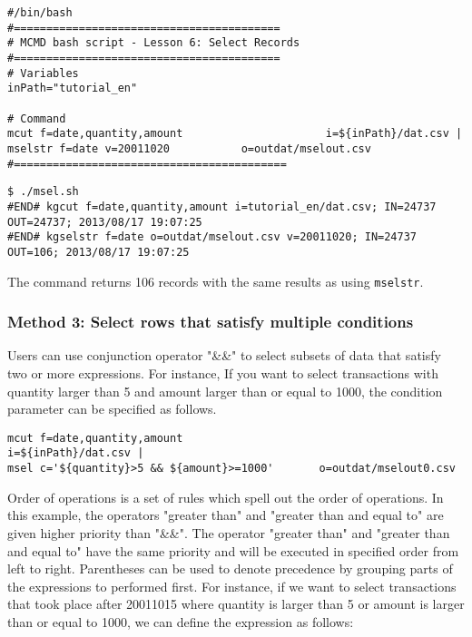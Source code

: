 \begin{verbatim}
#/bin/bash
#=========================================
# MCMD bash script - Lesson 6: Select Records 
#=========================================
# Variables
inPath="tutorial_en"

# Command 
mcut f=date,quantity,amount                      i=${inPath}/dat.csv |
mselstr f=date v=20011020  			o=outdat/mselout.csv
#==========================================
\end{verbatim}



\begin{verbatim}
$ ./msel.sh
#END# kgcut f=date,quantity,amount i=tutorial_en/dat.csv; IN=24737 OUT=24737; 2013/08/17 19:07:25
#END# kgselstr f=date o=outdat/mselout.csv v=20011020; IN=24737 OUT=106; 2013/08/17 19:07:25
\end{verbatim}

\noindent
The command returns 106 records with the same results as using \verb|mselstr|. 

\subsubsection{Method 3: Select rows that satisfy multiple conditions}

Users can use conjunction operator "\&\&" to select subsets of data that satisfy two or more expressions.  For instance, If you want to select transactions with quantity larger than 5 and amount larger than or equal to 1000, the condition parameter can be specified as follows.

\begin{verbatim}
mcut f=date,quantity,amount                     		i=${inPath}/dat.csv |
msel c='${quantity}>5 && ${amount}>=1000'       o=outdat/mselout0.csv
\end{verbatim}

Order of operations is a set of rules which spell out the order of operations. In this example, the operators "greater than" and "greater than and equal to" are given higher priority than "\&\&". The operator  "greater than" and "greater than and equal to" have the same priority and will be executed in specified order from left to right. Parentheses can be used to denote precedence by grouping parts of the expressions to performed first. For instance, if we want to select transactions that took place after 20011015 where quantity is larger than 5 or amount is larger than or equal to 1000, we can define the expression as follows: 

